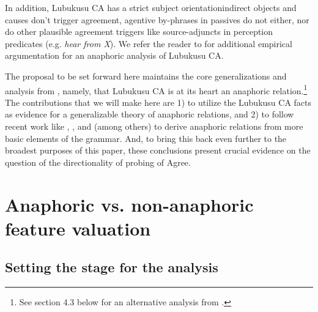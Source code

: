 \documentclass[output=paper
,modfonts
,nonflat
]{langsci/langscibook}
\begin{document}
In addition, Lubukusu CA has a strict subject orientation\textemdash indirect objects and causes don’t trigger agreement, agentive by-phrases in passives do not either, nor do other plausible agreement triggers like source-adjuncts in perception predicates (e.g. \textit{hear from X}). We refer the reader to \citet{Diercks:2010,Diercks:2013} for additional empirical argumentation for an anaphoric analysis of Lubukusu CA.

The proposal to be set forward here maintains the core generalizations and analysis from \citet{Diercks:2013}, namely, that Lubukusu CA is at its heart an anaphoric relation.\footnote{See section 4.3 below for an alternative analysis from \citet{Carstens:2016}.} The contributions that we will make here are 1) to utilize the Lubukusu CA facts as evidence for a generalizable theory of anaphoric relations, and 2) to follow recent work like \citet{Hicks:2009}, \citet{Reuland:2005,Reuland:2011}, and \citet{Rooryck:2011} (among others) to derive anaphoric relations from more basic elements of the grammar. And, to bring this back even further to the broadest purposes of this paper, these conclusions present crucial evidence on the question of the directionality of probing of Agree. 

\section{Anaphoric vs. non-anaphoric feature valuation} \label{AnalysisSection}

\subsection{Setting the stage for the analysis}
\end{document}
